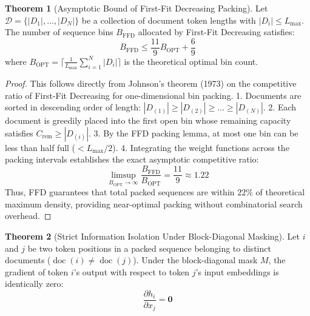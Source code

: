 \documentclass[11pt,a4paper]{article}
\theoremstyle{definition}
\newtheorem{theorem}{\textbf{Theorem}}[section]
\begin{document}
\begin{theorem}[Asymptotic Bound of First-Fit Decreasing Packing]
Let $\mathcal{D} = \{|D_1|, \dots, |D_N|\}$ be a collection of document token lengths with $|D_i| \le L_{\max}$. The number of sequence bins $B_{\text{FFD}}$ allocated by First-Fit Decreasing satisfies:
{\boldmath
\begin{equation}
B_{\text{FFD}} \le \frac{11}{9} B_{\text{OPT}} + \frac{6}{9}
\end{equation}
}
where $B_{\text{OPT}} = \lceil \frac{1}{L_{\max}} \sum_{i=1}^N |D_i| \rceil$ is the theoretical optimal bin count.
\end{theorem}

\begin{proof}
This follows directly from Johnson's theorem (1973) on the competitive ratio of First-Fit Decreasing for one-dimensional bin packing.
1. Documents are sorted in descending order of length: $|D_{(1)}| \ge |D_{(2)}| \ge \dots \ge |D_{(N)}|$.
2. Each document is greedily placed into the first open bin whose remaining capacity satisfies $C_{\text{rem}} \ge |D_{(i)}|$.
3. By the FFD packing lemma, at most one bin can be less than half full ($< L_{\max}/2$).
4. Integrating the weight functions across the packing intervals establishes the exact asymptotic competitive ratio:
{\boldmath
\begin{equation}
\limsup_{B_{\text{OPT}} \to \infty} \frac{B_{\text{FFD}}}{B_{\text{OPT}}} = \frac{11}{9} \approx 1.22
\end{equation}
}
Thus, FFD guarantees that total packed sequences are within $22\%$ of theoretical maximum density, providing near-optimal packing without combinatorial search overhead.
\end{proof}

\begin{theorem}[Strict Information Isolation Under Block-Diagonal Masking]
Let $i$ and $j$ be two token positions in a packed sequence belonging to distinct documents ($\operatorname{doc}(i) \neq \operatorname{doc}(j)$). Under the block-diagonal mask $M$, the gradient of token $i$'s output with respect to token $j$'s input embeddings is identically zero:
{\boldmath
\begin{equation}
\frac{\partial h_i}{\partial x_j} = \mathbf{0}
\end{equation}
}
\end{theorem}
\end{document}
